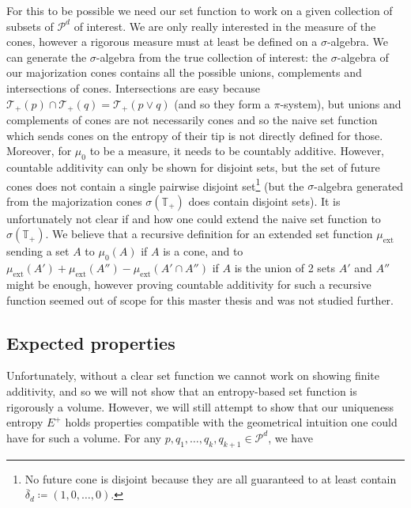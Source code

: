For this to be possible we need our set function to work on a given collection of subsets of $\mathcal{P}^d$ of interest. We are only really interested in the measure of the cones, however a rigorous measure must at least be defined on a $\sigma$-algebra. We can generate the $\sigma$-algebra from the true collection of interest: the $\sigma$-algebra of our majorization cones contains all the possible unions, complements and intersections of cones. Intersections are easy because $\mathcal{T}_+(p) \cap \mathcal{T}_+(q) = \mathcal{T}_+(p \vee q)$ (and so they form a $\pi$-system), but unions and complements of cones are not necessarily cones and so the naive set function which sends cones on the entropy of their tip is not directly defined for those. Moreover, for $\mu_0$ to be a measure, it needs to be countably additive. However, countable additivity can only be shown for disjoint sets, but the set of future cones does not contain a single pairwise disjoint set\footnote{No future cone is disjoint because they are all guaranteed to at least contain $\overline{\delta}_d \coloneqq (1, 0, \dots, 0)$.} (but the $\sigma$-algebra generated from the majorization cones $\sigma(\mathbb{T_+})$ does contain disjoint sets). It is unfortunately not clear if and how one could extend the naive set function to $\sigma(\mathbb{T_+})$. We believe that a recursive definition for an extended set function $\mu_{\text{ext}}$ sending a set $A$ to $\mu_0(A)$ if $A$ is a cone, and to $\mu_{\text{ext}}(A') +\mu_{\text{ext}}(A'') - \mu_{\text{ext}}(A' \cap A'')$ if $A$ is the union of 2 sets $A'$ and $A''$ might be enough, however proving countable additivity for such a recursive function seemed out of scope for this master thesis and was not studied further.



\subsection{Expected properties} \label{sec:unique_entropy_properties}

Unfortunately, without a clear set function we cannot work on showing finite additivity, and so we will not show that an entropy-based set function is rigorously a volume. However, we will still attempt to show that our uniqueness entropy $E^+$ holds properties compatible with the geometrical intuition one could have for such a volume. For any $p, q_1, \dots, q_k, q_{k+1} \in \mathcal{P}^d$, we have

